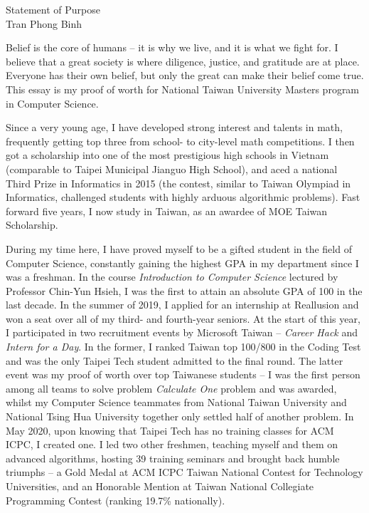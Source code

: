 \documentclass[letterpaper,12pt]{article}
\begin{document}
\begin{center}
{\Large Statement of Purpose} \\[.3in]
{\large Tran Phong Binh}
\end{center}

\vspace*{.5in}

Belief is the core of humans -- it is why we live, and it is what we fight for. I believe that a great society is where diligence, justice, and gratitude are at place.  Everyone has their own belief, but only the great can make their belief come true. This essay is my proof of worth for National Taiwan University Masters program in Computer Science.

Since a very young age, I have developed strong interest and talents in math, frequently getting top three from school- to city-level math competitions. I then got a scholarship into one of the most prestigious high schools in Vietnam (comparable to Taipei Municipal Jianguo High School), and aced a national Third Prize in Informatics in 2015 (the contest, similar to Taiwan Olympiad in Informatics, challenged students with highly arduous algorithmic problems). Fast forward five years, I now study in Taiwan, as an awardee of MOE Taiwan Scholarship.

During my time here, I have proved myself to be a gifted student in the field of Computer Science, constantly gaining the highest GPA in my department since I was a freshman. In the course \textit{Introduction to Computer Science} lectured by Professor Chin-Yun Hsieh, I was the first to attain an absolute GPA of 100 in the last decade. In the summer of 2019, I applied for an internship at Reallusion and won a seat over all of my third- and fourth-year seniors. At the start of this year, I participated in two recruitment events by Microsoft Taiwan -- \textit{Career Hack} and \textit{Intern for a Day}. In the former, I ranked Taiwan top 100/800 in the Coding Test and was the only Taipei Tech student admitted to the final round. The latter event was my proof of worth over top Taiwanese students -- I was the first person among all teams to solve problem \textit{Calculate One} problem and was awarded, whilst my Computer Science teammates from National Taiwan University and National Tsing Hua University together only settled half of another problem. In May 2020, upon knowing that Taipei Tech has no training classes for ACM ICPC, I created one. I led two other freshmen, teaching myself and them on advanced algorithms, hosting 39 training seminars and brought back humble triumphs -- a Gold Medal at ACM ICPC Taiwan National Contest for Technology Universities, and an Honorable Mention at Taiwan National Collegiate Programming Contest (ranking 19.7\% nationally).
\end{document}
